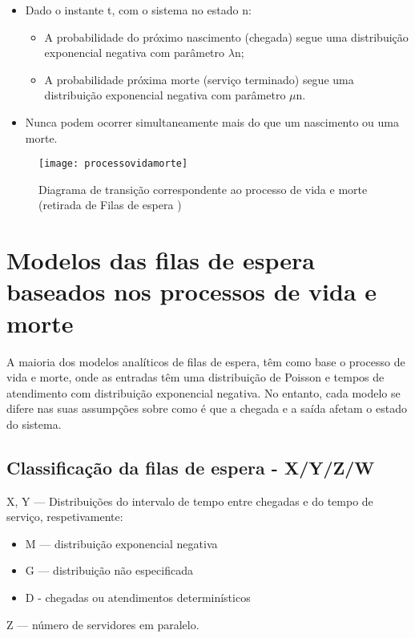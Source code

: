 \begin{itemize}
        \item Dado o instante t, com o sistema no estado n:
        \begin{itemize}
        \item A probabilidade do próximo nascimento (chegada) segue uma distribuição exponencial negativa com parâmetro $\lambda$n;
        \item A probabilidade próxima morte (serviço terminado) segue uma distribuição exponencial negativa com parâmetro $\mu$n.
        \end{itemize}
    \item Nunca podem ocorrer simultaneamente mais do que um nascimento ou uma morte.
\end{itemize}

\begin{figure}[ht]
    \centering
    \texttt{[image: processovidamorte]}
      \caption{Diagrama de transição correspondente ao processo de vida e morte (retirada de Filas de espera \cite{filasdeespera})}
  \label{fig:processovidamorte}
\end{figure}

\section{Modelos das filas de espera baseados nos processos de vida e morte} 
A maioria dos modelos analíticos de filas de espera, têm como base o processo de vida e morte, onde as entradas têm uma distribuição de Poisson \cite{poissondistribuition} e tempos de atendimento com distribuição exponencial negativa. No entanto, cada modelo se difere nas suas assumpções sobre como é que a chegada e a saída afetam o estado do sistema. 

\subsection{Classificação da filas de espera - X/Y/Z/W}
X, Y — Distribuições do intervalo de tempo entre chegadas e do tempo de serviço,
respetivamente:
\begin{itemize}
\item M — distribuição exponencial negativa
\item G — distribuição não especificada
\item D - chegadas ou atendimentos determinísticos
\end{itemize}
Z — número de servidores em paralelo.


